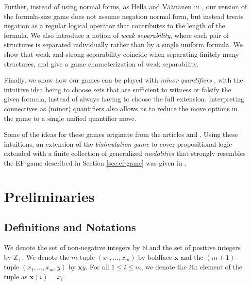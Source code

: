 \documentclass{article}
\theoremstyle{definition}
\begin{document}
Further, instead of using normal forms, as Hella and Väänänen in \cite{hellavaananen}, our version of the formula-size game does not assume negation normal form, but instead treats negation as a regular logical operator that contributes to the length of the formula. We also introduce a notion of \emph{weak separability}, where each pair of structures is separated individually rather than by a single uniform formula. We show that weak and strong separability coincide when separating finitely many structures, and give a game characterization of weak separability.

Finally, we show how our games can be played with \textit{minor quantifiers} \cite{kuusisto2015double}, with the intuitive idea being to choose sets that are sufficient to witness or falsify the given formula, instead of always having to choose the full extension. Interpreting connectives as (minor) quantifiers also allows us to reduce the move options in the game to a single unified quantifier move.

Some of the ideas for these games originate from the articles \cite{DBLP:journals/corr/Kuusisto14} and \cite{kuusisto2015double}. Using these intuitions, an extension of the \textit{bisimulation game} to cover propositional logic extended with a finite collection of generalized \textit{modalities} that strongly resembles the EF-game described in Section \ref{sec:ef-game} was given in \cite{jaakkola2025graph}.

\section{Preliminaries}

\subsection{Definitions and Notations}\label{subsec:definitions}

We denote the set of non-negative integers by $\mathbb{N}$ and the set of positive integers by $\mathbb{Z}_+$. We denote the $m$-tuple $( x_1,\ldots, x_m)$ by boldface $\mathbf{x}$ and the $(m+1)$-tuple $( x_1,\ldots,  x_m,y)$ by $\mathbf{x} y$. For all $1\leq i\leq m$, we denote the $i$th element of the tuple as $\mathbf{x}(i)=x_i$.

\end{document}
